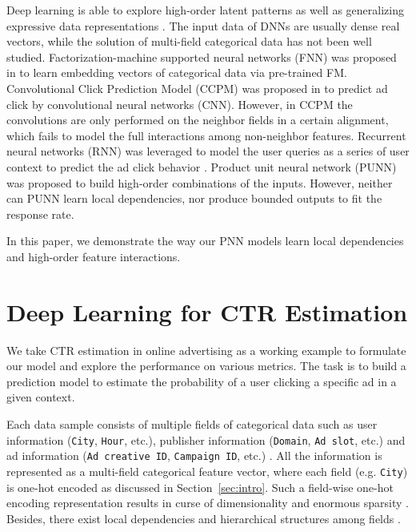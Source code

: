 \documentclass[conference]{IEEEtran}
\newcommand{\weinan}[1]{{\bf \color{red} [[Weinan says ``#1'']]}}
\newcommand{\rocky}[1]{{\bf \color{pink} [[Rocky says ``#1'']]}}
\begin{document}
Deep learning is able to explore high-order latent patterns as well as generalizing expressive data representations \cite{mikolov2013distributed}.
The input data of DNNs are usually dense real vectors, while the solution of multi-field categorical data has not been well studied. Factorization-machine supported neural networks (FNN) was proposed in \cite{zhang2016deep} to learn embedding vectors of categorical data via pre-trained FM.
Convolutional Click Prediction Model (CCPM) was proposed in \cite{liu2015convolutional} to predict ad click by convolutional neural networks (CNN). However, in CCPM the convolutions are only performed on the neighbor fields in a certain alignment, which fails to model the full interactions among non-neighbor features.
Recurrent neural networks (RNN) was leveraged to model the user queries as a series of user context to predict the ad click behavior \cite{zhang2014sequential}.
Product unit neural network (PUNN) \cite{engelbrecht1999training} was proposed to build high-order combinations of the inputs. However, neither can PUNN learn local dependencies, nor produce bounded outputs to fit the response rate.

In this paper, we demonstrate the way our PNN models learn local dependencies and high-order feature interactions.

\section{Deep Learning for CTR Estimation}\label{sec:methodology}

We take CTR estimation in online advertising \cite{richardson2007predicting} as a working example to formulate our model and explore the performance on various metrics. The task is to build a prediction model to estimate the probability of a user clicking a specific ad in a given context.

Each data sample consists of multiple fields of categorical data such as user information (\texttt{City}, \texttt{Hour}, etc.), publisher information (\texttt{Domain}, \texttt{Ad slot}, etc.) and ad information (\texttt{Ad creative ID}, \texttt{Campaign ID}, etc.) \cite{zhang2014real}. All the information is represented as a multi-field categorical feature vector, where each field (e.g. \texttt{City}) is one-hot encoded as discussed in Section~\ref{sec:intro}.
Such a field-wise one-hot encoding representation results in curse of dimensionality and enormous sparsity \cite{zhang2016deep}. Besides, there exist local dependencies and hierarchical structures among fields \cite{menon2011response}.
\end{document}
